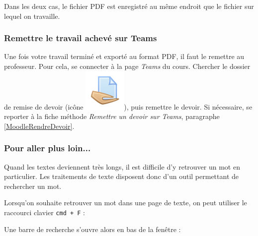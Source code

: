Dans les deux cas, le fichier PDF est enregistré au même endroit que le fichier sur lequel on travaille.










\subsubsection{Remettre le travail achevé sur Teams}

Une fois votre travail terminé et exporté au format PDF, il faut le remettre au professeur. Pour cela, se connecter à la page \emph{Teams} du cours. Chercher le dossier de remise de devoir (icône \includegraphics[width=.04\textwidth]{./images/methode/MoodleDevoirIcone1}), puis remettre le devoir. Si nécessaire, se reporter à la fiche méthode \emph{Remettre un devoir sur Teams}, paragraphe \vref{MoodleRendreDevoir}.  





\subsubsection{Pour aller plus loin...}  

Quand les textes deviennent très longs, il est difficile d'y retrouver un mot en particulier. Les traitements de texte disposent donc d'un outil permettant de rechercher un mot. 

Lorsqu'on souhaite retrouver un mot dans une page de texte, on peut utiliser le raccourci clavier \texttt{cmd + F} :   


Une barre de recherche s'ouvre alors en bas de la fenêtre :

